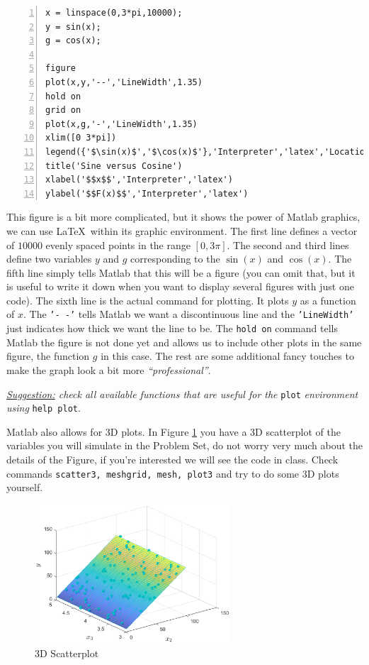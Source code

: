 \documentclass[a4paper,11pt]{article}
\begin{document}
\begin{Verbatim}[numbers=left, fontsize = \small]
x = linspace(0,3*pi,10000);
y = sin(x);
g = cos(x);

figure
plot(x,y,'--','LineWidth',1.35)
hold on
grid on
plot(x,g,'-','LineWidth',1.35)
xlim([0 3*pi])
legend({'$\sin(x)$','$\cos(x)$'},'Interpreter','latex','Location','best')
title('Sine versus Cosine')
xlabel('$$x$$','Interpreter','latex')
ylabel('$$F(x)$$','Interpreter','latex')
\end{Verbatim}

This figure is a bit more complicated, but it shows the power of Matlab graphics, we can use \LaTeX\ within its graphic environment. The first line defines a vector of $10000$ evenly spaced points in the range $[0,3\pi]$. The second and third lines define two variables $y$ and $g$ corresponding to the $\sin(x)$ and $\cos(x)$. The fifth line simply tells Matlab that this will be a figure (you can omit that, but it is useful to write it down when you want to display several figures with just one code). The sixth line is the actual command for plotting. It plots $y$ as a function of $x$. The \texttt{'- -'} tells Matlab we want a discontinuous line and the \texttt{'LineWidth'} just indicates how thick we want the line to be. The \texttt{hold on} command tells Matlab the figure is not done yet and allows us to include other plots in the same figure, the function $g$ in this case. The rest are some additional fancy touches to make the graph look a bit more \textit{``professional''}.

\textit{\underline{Suggestion:} check all available functions that are useful for the } \texttt{plot} \textit{environment using} \texttt{help plot}.

Matlab also allows for 3D plots. In Figure \ref{3dscatter} you have a 3D scatterplot of the variables you will simulate in the Problem Set, do not worry very much about the details of the Figure, if you're interested we will see the code in class. Check commands \texttt{scatter3, meshgrid, mesh, plot3} and try to do some 3D plots yourself.

\begin{figure}
\centering
	\includegraphics[width = 0.65\textwidth]{./figures/3dscatter.eps}
	\caption{3D Scatterplot}
	\label{3dscatter}
\end{figure}
\end{document}
